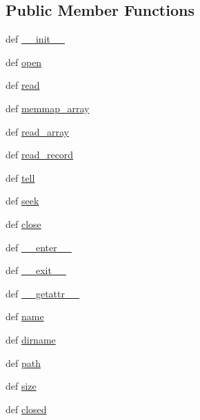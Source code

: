\subsection*{Public Member Functions}
\begin{DoxyCompactItemize}
\item 
def \hyperlink{classtifffile_1_1_file_handle_a256d28d56fa26bdc5a54056626dba06b}{\-\_\-\-\_\-init\-\_\-\-\_\-}
\item 
def \hyperlink{classtifffile_1_1_file_handle_aed5fb2120f32ee43f63a74e51ee19014}{open}
\item 
def \hyperlink{classtifffile_1_1_file_handle_a11284915485b77b0666fab6c13ff3052}{read}
\item 
def \hyperlink{classtifffile_1_1_file_handle_a57407ec5af06d23c9bad8c8b94a4c1e4}{memmap\-\_\-array}
\item 
def \hyperlink{classtifffile_1_1_file_handle_ae9a3b8d51a50d9cac82f80a33e3c9887}{read\-\_\-array}
\item 
def \hyperlink{classtifffile_1_1_file_handle_ace4a33bbf8c889940fea17f043042ce3}{read\-\_\-record}
\item 
def \hyperlink{classtifffile_1_1_file_handle_ac6a2ba4f361ef961cb206c2199513c70}{tell}
\item 
def \hyperlink{classtifffile_1_1_file_handle_a88d4b64db22c7a55afae0428b5e0200a}{seek}
\item 
def \hyperlink{classtifffile_1_1_file_handle_a8c345933b2368352aa97ee72aaeda596}{close}
\item 
def \hyperlink{classtifffile_1_1_file_handle_af0dcfc3f144e9ab96946cf8063142574}{\-\_\-\-\_\-enter\-\_\-\-\_\-}
\item 
def \hyperlink{classtifffile_1_1_file_handle_a7a59eb04f16fee7fafead1200bb4871b}{\-\_\-\-\_\-exit\-\_\-\-\_\-}
\item 
def \hyperlink{classtifffile_1_1_file_handle_a4ab2bf69b0a273e2ee43db2d9f2536b5}{\-\_\-\-\_\-getattr\-\_\-\-\_\-}
\item 
def \hyperlink{classtifffile_1_1_file_handle_a65426db83982602cb1e3e301eddf9fd6}{name}
\item 
def \hyperlink{classtifffile_1_1_file_handle_a1816f4d0d7568ebb37e4b473e527e106}{dirname}
\item 
def \hyperlink{classtifffile_1_1_file_handle_a23b95cb72e478e26496e6d3d7527a3a3}{path}
\item 
def \hyperlink{classtifffile_1_1_file_handle_a8fc096aaf40c918ccfc6f61304c63384}{size}
\item 
def \hyperlink{classtifffile_1_1_file_handle_ac35c2f69232e3c539f7b5859db1239c4}{closed}
\end{DoxyCompactItemize}
